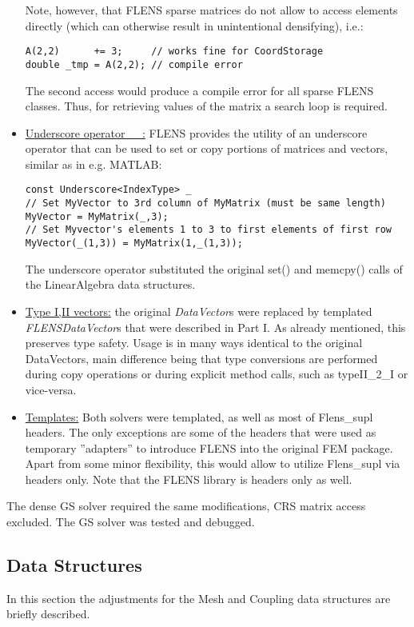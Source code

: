 \begin{itemize}
Note, however, that FLENS sparse matrices do not allow to access elements directly (which can otherwise result in unintentional densifying), i.e.:
\begin{lstlisting}
A(2,2)		+= 3;     // works fine for CoordStorage
double _tmp	= A(2,2); // compile error
\end{lstlisting}
The second access would produce a compile error for all sparse FLENS classes. Thus, for retrieving values of the matrix a search loop is required.
\item \underline{Underscore operator \textbf{\_} :} FLENS provides the utility of an underscore operator that can be used to set or copy portions of matrices and vectors, similar as in e.g. MATLAB:
\begin{lstlisting}
const Underscore<IndexType> _
// Set MyVector to 3rd column of MyMatrix (must be same length)
MyVector = MyMatrix(_,3);
// Set Myvector's elements 1 to 3 to first elements of first row
MyVector(_(1,3)) = MyMatrix(1,_(1,3));
\end{lstlisting}
The underscore operator substituted the original set() and memcpy() calls of the LinearAlgebra data structures.

\item \underline{Type I,II vectors:} the original \emph{DataVector}s were replaced by templated \emph{FLENSDataVector}s that were described in Part I. As already mentioned, this preserves type safety. Usage is in many ways identical to the original DataVectors, main difference being that type conversions are performed during copy operations or during explicit method calls, such as typeII\_2\_I or vice-versa.

\item \underline{Templates:} Both solvers were templated, as well as most of Flens\_supl headers. The only exceptions are some of the headers that were used as temporary ''adapters'' to introduce FLENS into the original FEM package. Apart from some minor flexibility, this would allow to utilize Flens\_supl via headers only. Note that the FLENS library is headers only as well.
\end{itemize}
The dense GS solver required the same modifications, CRS matrix access excluded. The GS solver was tested and debugged.

\subsection{Data Structures}
In this section the adjustments for the Mesh and Coupling data structures are briefly described.

